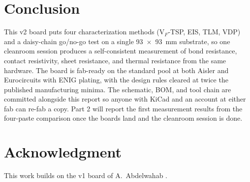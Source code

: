 \documentclass[conference]{IEEEtran}
\begin{document}
\section{Conclusion}

This v2 board puts four characterization methods (V$_F$-TSP, EIS, TLM,
VDP) and a daisy-chain go/no-go test on a single 93~$\times$~93~mm
substrate, so one cleanroom session produces a self-consistent measurement
of bond resistance, contact resistivity, sheet resistance, and thermal
resistance from the same hardware. The board is fab-ready on the
standard pool at both Aisler and Eurocircuits with ENIG plating, with the
design rules cleared at twice the published manufacturing minima. The
schematic, BOM, and tool chain are committed alongside this report so
anyone with KiCad and an account at either fab can re-fab a copy. Part 2 will report the first measurement
results from the four-paste comparison once the boards land and the
cleanroom session is done.

\section*{Acknowledgment}

This work builds on the v1 board of A.\ Abdelwahab \cite{abdelwahab2025ectc}.



\end{document}
